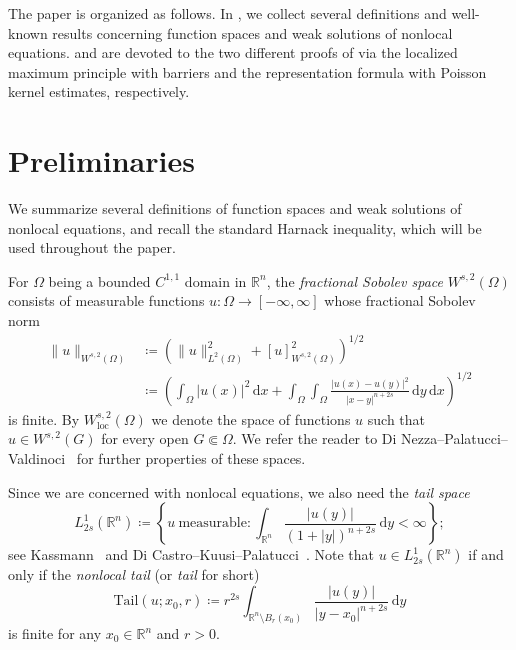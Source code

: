 \documentclass[11pt]{amsart}
\theoremstyle{plain}
\theoremstyle{definition}
\numberwithin{equation}{section}
\begin{document}
The paper is organized as follows. In , we collect several definitions and well-known results concerning function spaces and weak solutions of nonlocal equations.   and  are devoted to the two different proofs of  via the localized maximum principle with barriers and the representation formula with Poisson kernel estimates, respectively.


\section{Preliminaries}\label{sec-preliminaries}
We summarize several definitions of function spaces and weak solutions of nonlocal equations, and recall the standard Harnack inequality, which will be used throughout the paper. 

For $\Omega$ being a bounded $C^{1,1}$ domain in $\mathbb{R}^n$, the \emph{fractional Sobolev space} $W^{s, 2}(\Omega)$ consists of measurable functions $u: \Omega \to [-\infty, \infty]$ whose fractional Sobolev norm
\begin{align*}
\|u\|_{W^{s, 2}(\Omega)}
&\coloneqq \left( \|u\|_{L^2(\Omega)}^2 + [u]_{W^{s, 2}(\Omega)}^2 \right)^{1/2} \\
&\coloneqq \left( \int_\Omega |u(x)|^2 \,\mathrm{d}x + \int_\Omega \int_\Omega \frac{|u(x)-u(y)|^2}{|x-y|^{n+2s}} \,\mathrm{d}y\,\mathrm{d}x \right)^{1/2}
\end{align*}
is finite. By $W^{s, 2}_{\mathrm{loc}}(\Omega)$ we denote the space of functions $u$ such that $u \in W^{s, 2}(G)$ for every open $G \Subset \Omega$. We refer the reader to Di Nezza--Palatucci--Valdinoci~\cite{DNPV12} for further properties of these spaces.

Since we are concerned with nonlocal equations, we also need the \emph{tail space}
\begin{equation*}
L^{1}_{2s}(\mathbb{R}^n) \coloneqq \left\{ u~\text{measurable}: \int_{\mathbb{R}^n} \frac{|u(y)|}{(1+|y|)^{n+2s}} \,\mathrm{d}y < \infty \right\};
\end{equation*}
see Kassmann~\cite{Kas11} and Di Castro--Kuusi--Palatucci~\cite{DCKP16}. Note that $u \in L^{1}_{2s}(\mathbb{R}^n)$ if and only if the \emph{nonlocal tail} (or \emph{tail} for short)
\begin{equation}\label{eq-tail}
\mathrm{Tail}(u; x_0, r) \coloneqq r^{2s} \int_{\mathbb{R}^n \setminus B_r(x_0)} \frac{|u(y)|}{|y-x_0|^{n+2s}} \,\mathrm{d}y
\end{equation}
is finite for any $x_0 \in \mathbb{R}^n$ and $r>0$.
\end{document}
